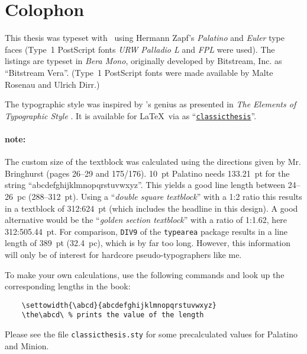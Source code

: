 \pagestyle{empty}

\hfill

\vfill


\section*{Colophon}
This thesis was typeset with \LaTeXe\ using Hermann Zapf's
\emph{Palatino}
and \emph{Euler} type faces (Type~1 PostScript fonts \emph{URW
Palladio L}
and \emph{FPL} were used). The listings are typeset in \emph{Bera
Mono}, originally developed by Bitstream, Inc. as ``Bitstream Vera''.
(Type~1 PostScript fonts were made available by Malte Rosenau and
Ulrich Dirr.)

The typographic style was inspired by 's genius as
presented in \emph{The Elements of Typographic Style} 
\citep{bringhurst:2002}. It is available for \LaTeX\ via  as 
``\href{http://www.ctan.org/tex-archive/macros/latex/contrib/classicthesis/}%
{\texttt{classicthesis}}''.

\paragraph{note:} The custom size of the textblock was calculated
using the directions given by Mr. Bringhurst (pages 26--29 and
175/176). 10~pt Palatino needs  133.21~pt for the string
``abcdefghijklmnopqrstuvwxyz''. This yields a good line length between
24--26~pc (288--312~pt). Using a ``\emph{double square textblock}''
with a 1:2 ratio this results in a textblock of 312:624~pt (which
includes the headline in this design). A good alternative would be the
``\emph{golden section textblock}'' with a ratio of 1:1.62, here
312:505.44~pt. For comparison, \texttt{DIV9} of the \texttt{typearea}
package results in a line length of 389~pt (32.4~pc), which is by far
too long. However, this information will only be of interest for
hardcore pseudo-typographers like me.%

To make your own calculations, use the following commands and look up
the corresponding lengths in the book:
\begin{verbatim}
    \settowidth{\abcd}{abcdefghijklmnopqrstuvwxyz}
    \the\abcd\ % prints the value of the length
\end{verbatim}
Please see the file \texttt{classicthesis.sty} for some precalculated 
values for Palatino and Minion.

    \settowidth{\abcd}{abcdefghijklmnopqrstuvwxyz}
    \the\abcd\ %


\bigskip

\noindent\finalVersionString



